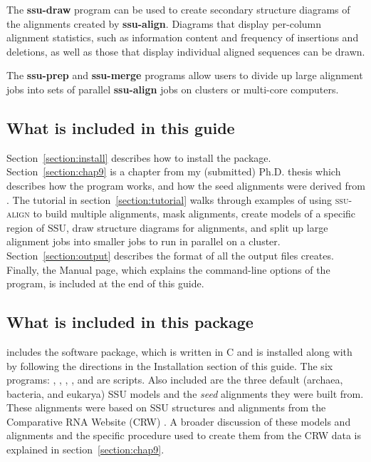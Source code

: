 The \textbf{ssu-draw} program can be used to create secondary
structure diagrams of the alignments created by 
\textbf{ssu-align}. Diagrams that display per-column alignment
statistics, such as information content and frequency of insertions
and deletions, as well as those that display individual aligned
sequences can be drawn.

The \textbf{ssu-prep} and \textbf{ssu-merge} programs allow users to
divide up large alignment jobs into sets of parallel
\textbf{ssu-align} jobs on clusters or multi-core computers.

\subsection{What is included in this guide}

Section~\ref{section:install} describes how to install the
package. Section~\ref{section:chap9} is a chapter from my (submitted)
Ph.D. thesis \cite{Nawrocki09b} which describes how the program works,
and how the seed alignments were derived from 
\cite{CannoneGutell02}.  The tutorial in
section~\ref{section:tutorial} walks through examples of using
\textsc{ssu-align} to build multiple alignments, mask alignments,
create models of a specific region of SSU, draw structure diagrams for
alignments, and split up large alignment jobs into smaller jobs to run
in parallel on a cluster.  Section~\ref{section:output} describes the
format of all the output files  creates. Finally, the
 Manual page, which explains the command-line options of
the program, is included at the end of this guide.

\subsection{What is included in this package}

 includes the  software package, which is
written in C and is installed along with  by following
the directions in the Installation section of this guide. The six
 programs: , ,
, ,  and 
are  scripts.  Also included are the three default (archaea,
bacteria, and eukarya) SSU models and the \emph{seed} alignments they
were built from. These alignments were based on SSU structures and
alignments from the Comparative RNA Website (CRW)
\cite{CannoneGutell02}. A broader discussion of these models and
alignments and the specific procedure used to create them from the CRW
data is explained in section~\ref{section:chap9}.


